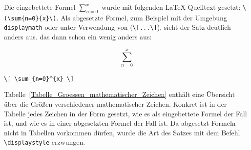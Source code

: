 \documentclass[a4paper,10pt,twoside]{scrbook}
\begin{document}
{

Die eingebettete Formel \(\sum_{n=0}^{x}\) wurde mit folgenden 
\LaTeX-Quelltext gesetzt: \verb!\(\sum{n=0}{x}\)!. Als abgesetzte Formel, zum Beispiel mit der Umgebung
\verb!displaymath! oder unter Verwendung von (\verb!\[...\]!), sieht der Satz deutlich anders aus. 
das dann schon ein wenig anders aus:

\begin{minipage}[c]{.4\textwidth}
\vspace*{-5mm}
\[ \sum_{n=0}^{x} \]
\end{minipage}
\hfill
\begin{minipage}[c]{.58\textwidth}
\setlength{\parskip}{1em}
\verb!\[ \sum_{n=0}^{x} \] !
\end{minipage}

Tabelle~\ref{Tabelle_Groessen_mathematischer_Zeichen} enthält eine Übersicht über die 
Größen verschiedener mathematischer Zeichen. Konkret ist in der Tabelle jedes Zeichen in der
Form gesetzt, wie es als eingebettete Formel der Fall ist, und wie es in einer abgesetzten Formel 
der Fall ist. Da abgesetzt Formeln nicht in Tabellen vorkommen dürfen, wurde die Art des Satzes mit dem Befehl 
\verb!\displaystyle! erzwungen.







}
\end{document}
